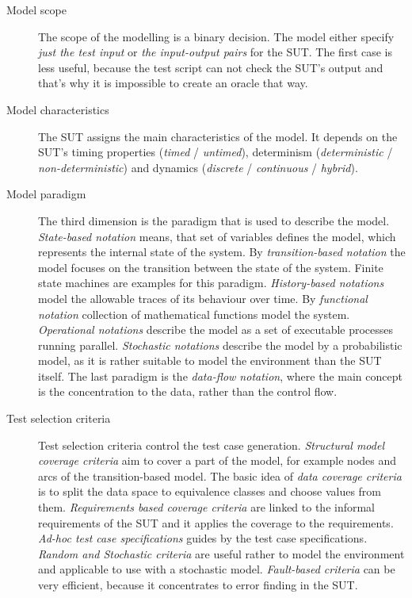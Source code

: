 \begin{description}
	\item[Model scope] The scope of the modelling is a binary decision. The model either specify \textit{just the test input} or \textit{the input-output pairs} for the SUT. The first case is less useful, because the test script can not check the SUT's output and that's why it is impossible to create an oracle that way.
	
	\item[Model characteristics] The SUT assigns the main characteristics of the model. It depends on the SUT's timing properties (\textit{timed} / \textit{untimed}), determinism (\textit{deterministic} / \textit{non-deterministic}) and dynamics (\textit{discrete} / \textit{continuous} / \textit{hybrid}).
	
	\item[Model paradigm] The third dimension is the paradigm that is used to describe the model. \textit{State-based notation} means, that set of variables defines the model, which represents the internal state of the system. By \textit{transition-based notation} the model focuses on the transition between the state of the system. Finite state machines are examples for this paradigm. \textit{History-based notations} model the allowable traces of its behaviour over time. By \textit{functional notation} collection of mathematical functions model the system. \textit{Operational notations} describe the model as a set of executable processes running parallel. \textit{Stochastic notations} describe the model by a probabilistic model, as it is rather suitable to model the environment than the SUT itself. The last paradigm is the \textit{data-flow notation}, where the main concept is the concentration to the data, rather than the control flow.
	
	\item[Test selection criteria] Test selection criteria control the test case generation. \textit{Structural model coverage criteria} aim to cover a part of the model, for example nodes and arcs of the transition-based model. The basic idea of \textit{data coverage criteria} is to split the data space to equivalence classes and choose values from them. \textit{Requirements based coverage criteria} are linked to the informal requirements of the SUT and it applies the coverage to the requirements. \textit{Ad-hoc test case specifications} guides by the test case specifications. \textit{Random and Stochastic criteria} are useful rather to model the environment and applicable to use with a stochastic model. \textit{Fault-based criteria} can be very efficient, because it concentrates to error finding in the SUT.
	

\end{description}
